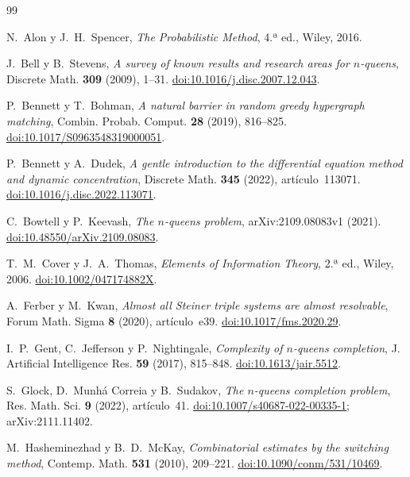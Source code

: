 \begin{thebibliography}{99}
{}
\raggedright

 N.~Alon y J.~H.~Spencer, \emph{The Probabilistic Method}, 4.ª ed.,
Wiley, 2016.

 J.~Bell y B.~Stevens, \emph{A survey of known results and research areas
for $n$-queens}, Discrete Math. \textbf{309} (2009), 1--31.
\href{https://doi.org/10.1016/j.disc.2007.12.043}{doi:10.1016/j.disc.2007.12.043}.

 P.~Bennett y T.~Bohman, \emph{A natural barrier in random greedy hypergraph
matching}, Combin. Probab. Comput. \textbf{28} (2019), 816--825.
\href{https://doi.org/10.1017/S0963548319000051}{doi:10.1017/S0963548319000051}.

 P.~Bennett y A.~Dudek, \emph{A gentle introduction to the differential
equation method and dynamic concentration}, Discrete Math. \textbf{345} (2022), artículo~113071.
\href{https://doi.org/10.1016/j.disc.2022.113071}{doi:10.1016/j.disc.2022.113071}.

 C.~Bowtell y P.~Keevash, \emph{The $n$-queens problem}, arXiv:2109.08083v1 (2021).
\href{https://doi.org/10.48550/arXiv.2109.08083}{doi:10.48550/arXiv.2109.08083}.

 T.~M.~Cover y J.~A.~Thomas, \emph{Elements of Information Theory},
2.ª ed., Wiley, 2006. \href{https://doi.org/10.1002/047174882X}{doi:10.1002/047174882X}.

 A.~Ferber y M.~Kwan, \emph{Almost all Steiner triple systems are almost
resolvable}, Forum Math. Sigma \textbf{8} (2020), artículo~e39.
\href{https://doi.org/10.1017/fms.2020.29}{doi:10.1017/fms.2020.29}.

 I.~P.~Gent, C.~Jefferson y P.~Nightingale, \emph{Complexity of $n$-queens completion},
J. Artificial Intelligence Res. \textbf{59} (2017), 815--848.
\href{https://doi.org/10.1613/jair.5512}{doi:10.1613/jair.5512}.

 S.~Glock, D.~Munhá Correia y B.~Sudakov, \emph{The $n$-queens completion problem},
Res. Math. Sci. \textbf{9} (2022), artículo~41.
\href{https://doi.org/10.1007/s40687-022-00335-1}{doi:10.1007/s40687-022-00335-1};
arXiv:2111.11402.

 M.~Hasheminezhad y B.~D.~McKay, \emph{Combinatorial estimates by the switching
method}, Contemp. Math. \textbf{531} (2010), 209--221.
\href{https://doi.org/10.1090/conm/531/10469}{doi:10.1090/conm/531/10469}.


\end{thebibliography}
